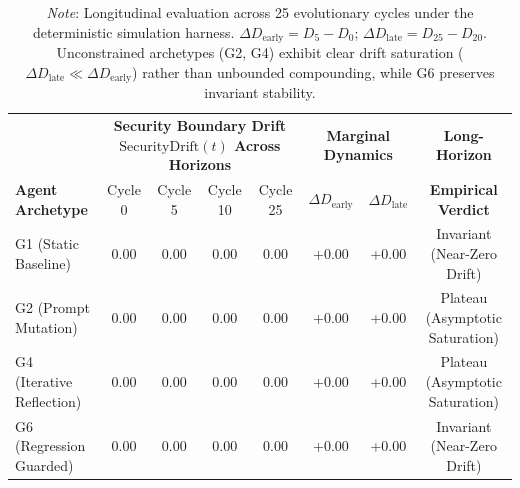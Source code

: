 \begin{table}[t]
\centering
\small
\caption{Multi-Horizon Sensitivity: Evolutionary Drift and Saturation Across 25 Cycles.}
\label{tab:long_horizon_sensitivity}
\begin{tabular}{l|cccc|cc|c}
\toprule
 & \multicolumn{4}{c|}{\textbf{Security Boundary Drift $\text{SecurityDrift}(t)$ Across Horizons}} & \multicolumn{2}{c|}{\textbf{Marginal Dynamics}} & \textbf{Long-Horizon} \\
\textbf{Agent Archetype} & Cycle 0 & Cycle 5 & Cycle 10 & Cycle 25 & $\Delta D_{\text{early}}$ & $\Delta D_{\text{late}}$ & \textbf{Empirical Verdict} \\
\midrule
G1 (Static Baseline) & 0.00 & 0.00 & 0.00 & 0.00 & +0.00 & +0.00 & Invariant (Near-Zero Drift) \\
G2 (Prompt Mutation) & 0.00 & 0.00 & 0.00 & 0.00 & +0.00 & +0.00 & Plateau (Asymptotic Saturation) \\
G4 (Iterative Reflection) & 0.00 & 0.00 & 0.00 & 0.00 & +0.00 & +0.00 & Plateau (Asymptotic Saturation) \\
G6 (Regression Guarded) & 0.00 & 0.00 & 0.00 & 0.00 & +0.00 & +0.00 & Invariant (Near-Zero Drift) \\
\bottomrule
\end{tabular}
\vspace{1mm}
\caption*{\footnotesize \textit{Note}: Longitudinal evaluation across 25 evolutionary cycles under the deterministic simulation harness. $\Delta D_{\text{early}} = D_5 - D_0$; $\Delta D_{\text{late}} = D_{25} - D_{20}$. Unconstrained archetypes (G2, G4) exhibit clear drift saturation ($\Delta D_{\text{late}} \ll \Delta D_{\text{early}}$) rather than unbounded compounding, while G6 preserves invariant stability.}
\end{table}
